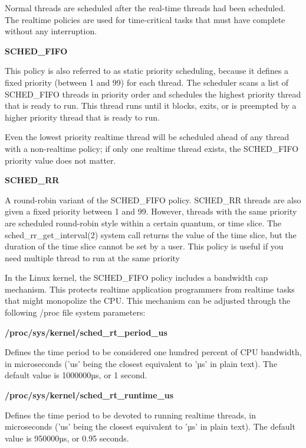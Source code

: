 \documentclass[english]{article}
\begin{document}
\vspace{0.5cm}{\bf 2.2.1 Realtime scheduling policies}

Normal threads are scheduled after the real-time threads had been scheduled. The realtime policies are used for time-critical tasks that must have complete without any interruption.

{\bf SCHED\_FIFO}

This policy is also referred to as static priority scheduling, because it defines a fixed priority (between 1 and 99) for each thread. The scheduler scans a list of SCHED\_FIFO threads in priority order and schedules the highest priority thread that is ready to run. This thread runs until it blocks, exits, or is preempted by a higher priority thread that is ready to run.

Even the lowest priority realtime thread will be scheduled ahead of any thread with a non-realtime policy; if only one realtime thread exists, the SCHED\_FIFO priority value does not matter.

{\bf SCHED\_RR}

A round-robin variant of the SCHED\_FIFO policy. SCHED\_RR threads are also given a fixed priority between 1 and 99. However, threads with the same priority are scheduled round-robin style within a certain quantum, or time slice. The sched\_rr\_get\_interval(2) system call returns the value of the time slice, but the duration of the time slice cannot be set by a user. This policy is useful if you need multiple thread to run at the same priority


\vspace{0.5cm}{\bf 2.2.1.1 SCHED\_FIFO policy}

In the Linux kernel, the SCHED\_FIFO policy includes a bandwidth cap mechanism. This protects realtime application programmers from realtime tasks that might monopolize the CPU. This mechanism can be adjusted through the following /proc file system parameters:

{\bf /proc/sys/kernel/sched\_rt\_period\_us}

Defines the time period to be considered one hundred percent of CPU bandwidth, in microseconds ('us' being the closest equivalent to 'µs' in plain text). The default value is 1000000µs, or 1 second.


{\bf /proc/sys/kernel/sched\_rt\_runtime\_us}

Defines the time period to be devoted to running realtime threads, in microseconds ('us' being the closest equivalent to 'µs' in plain text). The default value is 950000µs, or 0.95 seconds.
\end{document}
